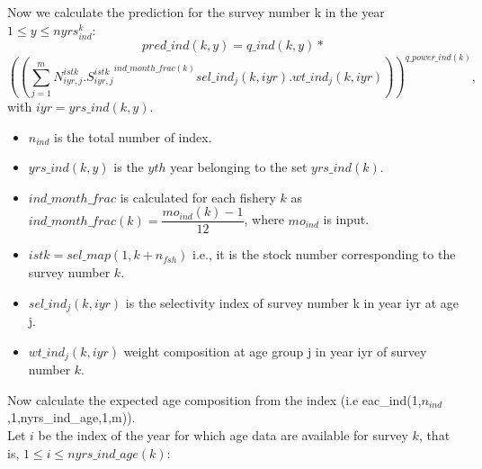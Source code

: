 \documentclass{article}
\begin{document}
Now we calculate the prediction for the survey number k in the year $1\leq y \leq nyrs_{ind}^k$:
\begin{equation}
    pred\_ind(k,y)=q\_ind(k,y)*
\end{equation}
\begin{equation}
    \left(\left(\sum_{j=1}^mN^{istk}_{iyr,j}.{S^{istk}_{iyr,j}}^{ind\_month\_frac(k)}sel\_ind_j(k,iyr).wt\_ind_j(k,iyr)\right)\right)^{q\_power\_ind(k)},
\end{equation}
with $iyr=yrs\_ind(k,y)$.
\begin{itemize}
\item $n_{ind}$ is the total number of index.
\item $yrs\_ind(k,y)$ is the $yth$ year belonging to the set $yrs\_ind(k)$.

    \item $ind\_month\_frac$ is calculated for each fishery $k$ as $ind\_month\_frac(k)=\dfrac{mo_{ind}(k)-1}{12}$, where $mo_{ind}$ is input.
    \item $istk=sel\_map(1,k+n_{fsh})$ 
i.e., it is the stock number corresponding to the survey number $k$.
    \item $sel\_ind_j(k,iyr)$ 
is the selectivity index of survey number k in year iyr at age j.
    \item $wt\_ind_j(k,iyr)$ 
weight composition at age group j in year iyr of survey number $k$. %
    \end{itemize}
    Now calculate the expected age composition from the index (i.e eac\_ind(1,$n_{ind}$,1,nyrs\_ind\_age,1,m)).\\
Let $i$ be the index of the year for which age data are available for survey $k$, that is, $1\leq i \leq nyrs\_ind\_age(k)$:
\end{document}
